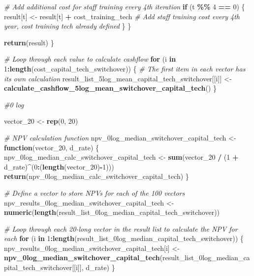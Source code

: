 \documentclass[
]{article}
\newenvironment{Shaded}{\begin{snugshade}}{\end{snugshade}}
\newcommand{\CommentTok}[1]{\textcolor[rgb]{0.56,0.35,0.01}{\textit{#1}}}
\newcommand{\ControlFlowTok}[1]{\textcolor[rgb]{0.13,0.29,0.53}{\textbf{#1}}}
\newcommand{\DecValTok}[1]{\textcolor[rgb]{0.00,0.00,0.81}{#1}}
\newcommand{\FunctionTok}[1]{\textcolor[rgb]{0.13,0.29,0.53}{\textbf{#1}}}
\newcommand{\NormalTok}[1]{#1}
\newcommand{\OtherTok}[1]{\textcolor[rgb]{0.56,0.35,0.01}{#1}}
\newcommand{\SpecialCharTok}[1]{\textcolor[rgb]{0.81,0.36,0.00}{\textbf{#1}}}
\begin{document}
\begin{Shaded}
\begin{Highlighting}[]
    \CommentTok{\# Add additional cost for staff training every 4th iteration}
    \ControlFlowTok{if}\NormalTok{ (t }\SpecialCharTok{\%\%} \DecValTok{4} \SpecialCharTok{==} \DecValTok{0}\NormalTok{) \{}
\NormalTok{      result[t] }\OtherTok{\textless{}{-}}\NormalTok{ result[t] }\SpecialCharTok{+}\NormalTok{ cost\_training\_tech  }\CommentTok{\# Add staff training cost every 4th year, cost training tech already defined}
\NormalTok{    \}}
\NormalTok{  \}}
  
  \FunctionTok{return}\NormalTok{(result)}
\NormalTok{\}}

\CommentTok{\# Loop through each value to calculate cashflow}
\ControlFlowTok{for}\NormalTok{ (i }\ControlFlowTok{in} \DecValTok{1}\SpecialCharTok{:}\FunctionTok{length}\NormalTok{(cost\_capital\_tech\_switchover)) \{}
  \CommentTok{\# The first item in each vector has its own calculation}
\NormalTok{  result\_list\_5log\_mean\_capital\_tech\_switchover[[i]] }\OtherTok{\textless{}{-}} \FunctionTok{calculate\_cashflow\_5log\_mean\_switchover\_capital\_tech}\NormalTok{()}
\NormalTok{\}}



\CommentTok{\#0 log }

\NormalTok{vector\_20 }\OtherTok{\textless{}{-}} \FunctionTok{rep}\NormalTok{(}\DecValTok{0}\NormalTok{, }\DecValTok{20}\NormalTok{)}

\CommentTok{\# NPV calculation function}
\NormalTok{npv\_0log\_median\_switchover\_capital\_tech }\OtherTok{\textless{}{-}} \ControlFlowTok{function}\NormalTok{(vector\_20, d\_rate) \{}
\NormalTok{  npv\_0log\_median\_calc\_switchover\_capital\_tech }\OtherTok{\textless{}{-}} \FunctionTok{sum}\NormalTok{(vector\_20 }\SpecialCharTok{/}\NormalTok{ (}\DecValTok{1} \SpecialCharTok{+}\NormalTok{ d\_rate)}\SpecialCharTok{\^{}}\NormalTok{(}\DecValTok{0}\SpecialCharTok{:}\NormalTok{(}\FunctionTok{length}\NormalTok{(vector\_20)}\SpecialCharTok{{-}}\DecValTok{1}\NormalTok{)))}
  \FunctionTok{return}\NormalTok{(npv\_0log\_median\_calc\_switchover\_capital\_tech)}
\NormalTok{\}}

\CommentTok{\# Define a vector to store NPVs for each of the 100 vectors}
\NormalTok{npv\_results\_0log\_median\_switchover\_capital\_tech }\OtherTok{\textless{}{-}} \FunctionTok{numeric}\NormalTok{(}\FunctionTok{length}\NormalTok{(result\_list\_0log\_median\_capital\_tech\_switchover))}

\CommentTok{\# Loop through each 20{-}long vector in the result list to calculate the NPV for each}
\ControlFlowTok{for}\NormalTok{ (i }\ControlFlowTok{in} \DecValTok{1}\SpecialCharTok{:}\FunctionTok{length}\NormalTok{(result\_list\_0log\_median\_capital\_tech\_switchover)) \{}
\NormalTok{  npv\_results\_0log\_median\_switchover\_capital\_tech[i] }\OtherTok{\textless{}{-}} \FunctionTok{npv\_0log\_median\_switchover\_capital\_tech}\NormalTok{(result\_list\_0log\_median\_capital\_tech\_switchover[[i]], d\_rate)}
\NormalTok{\}}



\end{Highlighting}
\end{Shaded}
\end{document}
